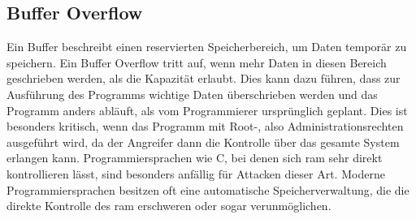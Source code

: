 \documentclass[11pt, a4paper]{article}
\begin{document}
\subsection{Buffer Overflow}\label{subsec:buffer-overflow}
Ein Buffer beschreibt einen reservierten Speicherbereich, um Daten temporär zu speichern. Ein Buffer Overflow tritt auf, wenn mehr Daten in diesen Bereich geschrieben werden, als die Kapazität erlaubt. Dies kann dazu führen, dass zur Ausführung des Programms wichtige Daten überschrieben werden und das Programm anders abläuft, als vom Programmierer ursprünglich geplant. Dies ist besonders kritisch, wenn das Programm mit Root-, also Administrationsrechten ausgeführt wird, da der Angreifer dann die Kontrolle über das gesamte System erlangen kann. Programmiersprachen wie C, bei denen sich \gls{ram} sehr direkt kontrollieren lässt, sind besonders anfällig für Attacken dieser Art. Moderne Programmiersprachen besitzen oft eine automatische Speicherverwaltung, die die direkte Kontrolle des \gls{ram} erschweren oder sogar verunmöglichen.
\end{document}
